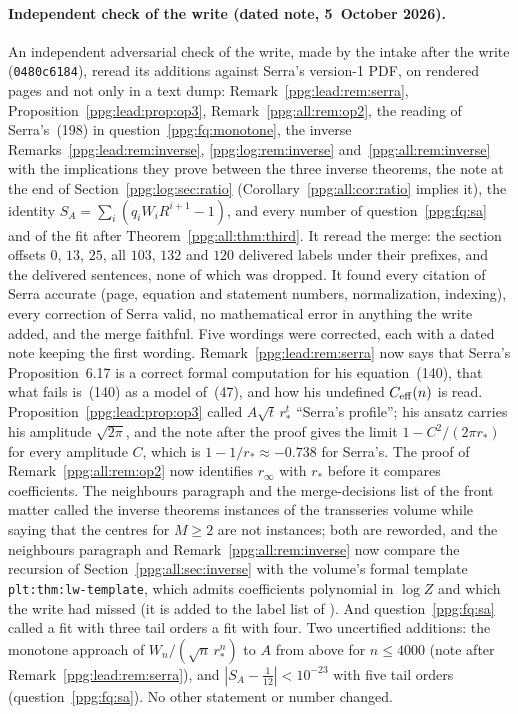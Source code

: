 \documentclass[11pt,letterpaper]{article}
\theoremstyle{remark}\newtheorem{remark}[theorem]{Remark}
\numberwithin{equation}{section}
\begin{document}
\paragraph{Independent check of the write (dated note, 5~October 2026).}
An independent adversarial check of the write, made by the intake after the write (\texttt{0480c6184}), reread its additions against Serra's version-1 PDF, on rendered pages and not only in a text dump: Remark~\ref{ppg:lead:rem:serra}, Proposition~\ref{ppg:lead:prop:op3}, Remark~\ref{ppg:all:rem:op2}, the reading of Serra's~(198) in question~\ref{ppg:fq:monotone}, the inverse Remarks~\ref{ppg:lead:rem:inverse}, \ref{ppg:log:rem:inverse} and~\ref{ppg:all:rem:inverse} with the implications they prove between the three inverse theorems, the note at the end of Section~\ref{ppg:log:sec:ratio} (Corollary~\ref{ppg:all:cor:ratio} implies it), the identity $S_A=\sum_i(q_iW_iR^{i+1}-1)$, and every number of question~\ref{ppg:fq:sa} and of the fit after Theorem~\ref{ppg:all:thm:third}. It reread the merge: the section offsets $0$, $13$, $25$, all $103$, $132$ and $120$ delivered labels under their prefixes, and the delivered sentences, none of which was dropped. It found every citation of Serra accurate (page, equation and statement numbers, normalization, indexing), every correction of Serra valid, no mathematical error in anything the write added, and the merge faithful. Five wordings were corrected, each with a dated note keeping the first wording. Remark~\ref{ppg:lead:rem:serra} now says that Serra's Proposition~6.17 is a correct formal computation for his equation~(140), that what fails is~(140) as a model of~(47), and how his undefined $C_{\rm eff}(n)$ is read. Proposition~\ref{ppg:lead:prop:op3} called $A\sqrt t\,r_*^t$ ``Serra's profile''; his ansatz carries his amplitude $\sqrt{2\pi}$, and the note after the proof gives the limit $1-C^2/(2\pi r_*)$ for every amplitude $C$, which is $1-1/r_*\approx-0.738$ for Serra's. The proof of Remark~\ref{ppg:all:rem:op2} now identifies $r_\infty$ with $r_*$ before it compares coefficients. The neighbours paragraph and the merge-decisions list of the front matter called the inverse theorems instances of the transseries volume while saying that the centres for $M\ge2$ are not instances; both are reworded, and the neighbours paragraph and Remark~\ref{ppg:all:rem:inverse} now compare the recursion of Section~\ref{ppg:all:sec:inverse} with the volume's formal template \texttt{plt:thm:lw-template}, which admits coefficients polynomial in $\log Z$ and which the write had missed (it is added to the label list of \cite{tsvol}). And question~\ref{ppg:fq:sa} called a fit with three tail orders a fit with four. Two uncertified additions: the monotone approach of $W_n/(\sqrt n\,r_*^n)$ to $A$ from above for $n\le4000$ (note after Remark~\ref{ppg:lead:rem:serra}), and $|S_A-\frac1{12}|<10^{-23}$ with five tail orders (question~\ref{ppg:fq:sa}). No other statement or number changed.
\end{document}
